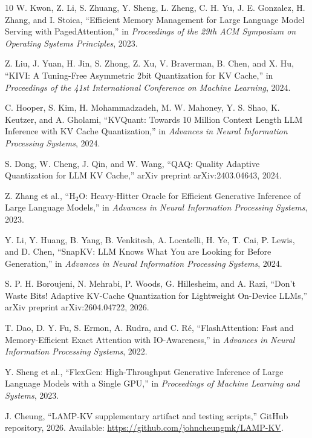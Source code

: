 \documentclass[11pt]{article}
\begin{document}
\begin{thebibliography}{10}
W. Kwon, Z. Li, S. Zhuang, Y. Sheng, L. Zheng, C. H. Yu, J. E. Gonzalez, H. Zhang, and I. Stoica, ``Efficient Memory Management for Large Language Model Serving with PagedAttention,'' in \emph{Proceedings of the 29th ACM Symposium on Operating Systems Principles}, 2023.

Z. Liu, J. Yuan, H. Jin, S. Zhong, Z. Xu, V. Braverman, B. Chen, and X. Hu, ``KIVI: A Tuning-Free Asymmetric 2bit Quantization for KV Cache,'' in \emph{Proceedings of the 41st International Conference on Machine Learning}, 2024.

C. Hooper, S. Kim, H. Mohammadzadeh, M. W. Mahoney, Y. S. Shao, K. Keutzer, and A. Gholami, ``KVQuant: Towards 10 Million Context Length LLM Inference with KV Cache Quantization,'' in \emph{Advances in Neural Information Processing Systems}, 2024.

S. Dong, W. Cheng, J. Qin, and W. Wang, ``QAQ: Quality Adaptive Quantization for LLM KV Cache,'' arXiv preprint arXiv:2403.04643, 2024.

Z. Zhang et al., ``H$_2$O: Heavy-Hitter Oracle for Efficient Generative Inference of Large Language Models,'' in \emph{Advances in Neural Information Processing Systems}, 2023.

Y. Li, Y. Huang, B. Yang, B. Venkitesh, A. Locatelli, H. Ye, T. Cai, P. Lewis, and D. Chen, ``SnapKV: LLM Knows What You are Looking for Before Generation,'' in \emph{Advances in Neural Information Processing Systems}, 2024.

S. P. H. Boroujeni, N. Mehrabi, P. Woods, G. Hillesheim, and A. Razi, ``Don't Waste Bits! Adaptive KV-Cache Quantization for Lightweight On-Device LLMs,'' arXiv preprint arXiv:2604.04722, 2026.

T. Dao, D. Y. Fu, S. Ermon, A. Rudra, and C. R\'e, ``FlashAttention: Fast and Memory-Efficient Exact Attention with IO-Awareness,'' in \emph{Advances in Neural Information Processing Systems}, 2022.

Y. Sheng et al., ``FlexGen: High-Throughput Generative Inference of Large Language Models with a Single GPU,'' in \emph{Proceedings of Machine Learning and Systems}, 2023.

J. Cheung, ``LAMP-KV supplementary artifact and testing scripts,'' GitHub repository, 2026. Available: \url{https://github.com/johncheungmk/LAMP-KV}.
\end{thebibliography}
\end{document}
